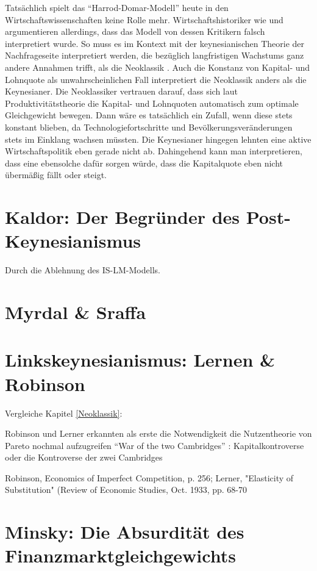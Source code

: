 Tatsächlich spielt das "`Harrod-Domar-Modell"' heute in den Wirtschaftswissenschaften keine Rolle mehr. Wirtschaftshistoriker wie \textcite{Berg2013} und \textcite{Boianovsky2018} argumentieren allerdings, dass das Modell von dessen Kritikern falsch interpretiert wurde. So muss es im Kontext mit der keynesianischen Theorie der Nachfrageseite interpretiert werden, die bezüglich langfristigen Wachstums ganz andere Annahmen trifft, als die Neoklassik \parencite[S. 479]{Boianovsky2018}. Auch die Konstanz von Kapital- und Lohnquote als unwahrscheinlichen Fall interpretiert die Neoklassik anders als die Keynesianer. Die Neoklassiker vertrauen darauf, dass sich laut Produktivitätstheorie die Kapital- und Lohnquoten automatisch zum optimale Gleichgewicht bewegen. Dann wäre es tatsächlich ein Zufall, wenn diese stets konstant blieben, da Technologiefortschritte und Bevölkerungsveränderungen stets im Einklang wachsen müssten. Die Keynesianer hingegen lehnten eine aktive Wirtschaftspolitik eben gerade nicht ab. Dahingehend kann man interpretieren, dass eine ebensolche dafür sorgen würde, dass die Kapitalquote eben nicht übermäßig fällt oder steigt.



\section{Kaldor: Der Begründer des Post-Keynesianismus}
Durch die Ablehnung des IS-LM-Modells.

\section{Myrdal \& Sraffa}

\section{Linkskeynesianismus: Lernen \& Robinson}

Vergleiche Kapitel \ref{Neoklassik}:

Robinson und Lerner erkannten als erste die Notwendigkeit die Nutzentheorie von Pareto nochmal aufzugreifen
"`War of the two Cambridges"' \parencite{Tobin1985}: Kapitalkontroverse oder die Kontroverse der zwei Cambridges

Robinson, Economics of Imperfect Competition, p. 256; Lerner, "Elasticity of Substitution" (Review of Economic Studies, Oct. 1933, pp. 68-70

\section{Minsky: Die Absurdität des Finanzmarktgleichgewichts}

